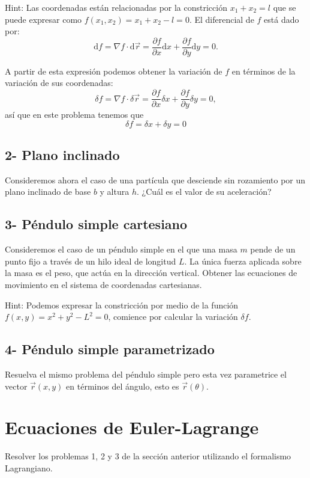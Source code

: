 \documentclass[letterpaper,12pt]{article}
\begin{document}
Hint: Las coordenadas están relacionadas por la constricción $x_1 + x_2 = l$ que se puede expresar como $f(x_1, x_2) = x_1 + x_2 - l = 0$. El diferencial de $f$ está dado por:
\[
    \mathrm{d} f = \nabla f \cdot \mathrm{d} \vec{r} = \frac{\partial f}{\partial x} \mathrm{d}x + \frac{\partial f}{\partial y} \mathrm{d}y = 0.
\]

A partir de esta expresión podemos obtener la variación de $f$ en términos de la variación de sus coordenadas:
\[
    \delta f = \nabla f \cdot \delta \vec{r} = \frac{\partial f}{\partial x} \delta x + \frac{\partial f}{\partial y} \delta y = 0,
\]
así que en este problema tenemos que
\[
     \delta f = \delta x + \delta y = 0
\]

\subsection{2- Plano inclinado}
Consideremos ahora el caso de una partícula que desciende sin rozamiento por un plano inclinado de base $b$ y altura $h$. ¿Cuál es el valor de su aceleración?

\subsection{3- Péndulo simple cartesiano}
Consideremos el caso de un péndulo simple en el que una masa $m$ pende de un punto fijo a través de un hilo ideal de longitud $L$. La única fuerza aplicada sobre la masa es el peso, que actúa en la dirección vertical. Obtener las ecuaciones de movimiento en el sistema de coordenadas cartesianas.

Hint: Podemos expresar la constricción por medio de la función $f(x, y) = x^2 + y^2 - L^2 = 0$, comience por calcular la variación $\delta f$.

\subsection{4- Péndulo simple parametrizado}
Resuelva el mismo problema del péndulo simple pero esta vez parametrice el vector $\vec{r}(x, y)$ en términos del ángulo, esto es $\vec{r}(\theta)$.

\section{Ecuaciones de Euler-Lagrange}
Resolver los problemas 1, 2 y 3 de la sección anterior utilizando el formalismo Lagrangiano.
\end{document}
